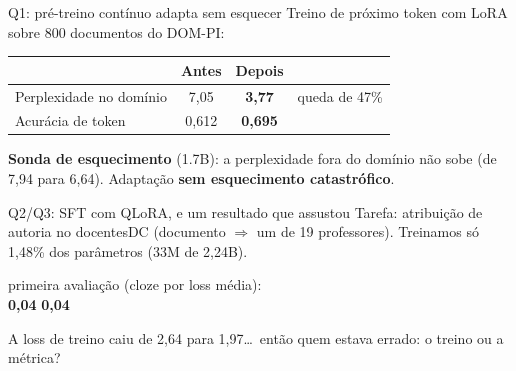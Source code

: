 \documentclass[aspectratio=169,11pt]{beamer}
\newcommand{\bignum}[1]{{\fontsize{30}{34}\selectfont\bfseries #1}}
\begin{document}

\begin{frame}{Q1: pré-treino contínuo adapta sem esquecer}
  Treino de próximo token com LoRA sobre 800 documentos do DOM-PI:
  \vspace{2mm}
  \begin{center}
    \begin{tabular}{lccc}
      \toprule
      & Antes & Depois & \\
      \midrule
      Perplexidade no domínio & 7,05 & \textbf{3,77} &
        {\footnotesize queda de 47\%}\\
      Acurácia de token & 0,612 & \textbf{0,695} & \\
      \bottomrule
    \end{tabular}
  \end{center}
  \vspace{3mm}
  \textbf{Sonda de esquecimento} (1.7B): a perplexidade
  \alert{fora do domínio não sobe} (de 7,94 para 6,64).
  Adaptação \textbf{sem esquecimento catastrófico}.
\end{frame}


\begin{frame}{Q2/Q3: SFT com QLoRA, e um resultado que assustou}
  Tarefa: \alert{atribuição de autoria} no docentesDC
  (documento $\Rightarrow$ um de 19 professores).
  Treinamos só \alert{1,48\%} dos parâmetros (33M de 2,24B).
  \vspace{4mm}
  \begin{center}
    primeira avaliação (cloze por loss média):\\[3mm]
    \bignum{0,04}\qquad
    \bignum{0,04}
  \end{center}
  \vspace{4mm}
  \centering A loss de treino caiu de 2,64 para 1,97\ldots\
  então \alert{quem estava errado: o treino ou a métrica?}
\end{frame}
\end{document}
